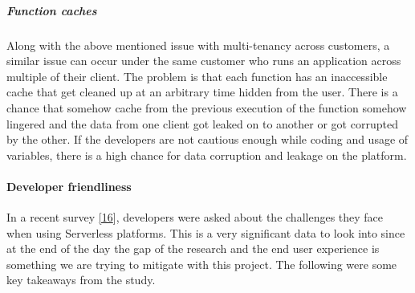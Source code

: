 \documentclass[12pt,titlepage]{article}
\begin{document}
\subparagraph{Function caches}
\label{sec:org463c834}
Along with the above mentioned issue with multi-tenancy across customers, a
similar issue can occur under the same customer who runs an application across
multiple of their client. The problem is that each function has an inaccessible
cache that get cleaned up at an arbitrary time hidden from the user. There is a
chance that somehow cache from the previous execution of the function somehow
lingered and the data from one client got leaked on to another or got corrupted
by the other. If the developers are not cautious enough while coding and usage
of variables, there is a high chance for data corruption and leakage on the platform.

\paragraph{Developer friendliness}
\label{sec:org333f33e}
In a recent survey \hyperref[ref:16]{[16}], developers were asked about the challenges they face when
using Serverless platforms. This is a very significant data to look into since
at the end of the day the gap of the research and the end user experience is
something we are trying to mitigate with this project. The following were some
key takeaways from the study.
\end{document}
